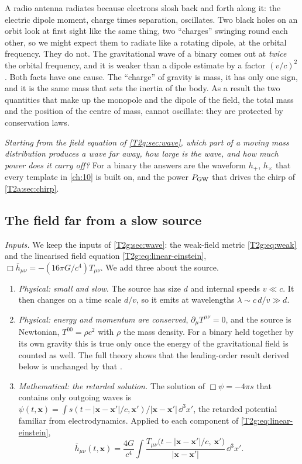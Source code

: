 A radio antenna radiates because electrons slosh back and forth along it: the electric dipole moment, charge times separation, oscillates. Two black holes on an orbit look at first sight like the same thing, two ``charges'' swinging round each other, so we might expect them to radiate like a rotating dipole, at the orbital frequency. They do not. The gravitational wave of a binary comes out at \emph{twice} the orbital frequency, and it is weaker than a dipole estimate by a factor $(v/c)^2$. Both facts have one cause. The ``charge'' of gravity is mass, it has only one sign, and it is the same mass that sets the inertia of the body. As a result the two quantities that make up the monopole and the dipole of the field, the total mass and the position of the centre of mass, cannot oscillate: they are protected by conservation laws.

\emph{Starting from the field equation of \cref{T2g:sec:wave}, which part of a moving mass distribution produces a wave far away, how large is the wave, and how much power does it carry off?} For a binary the answers are the waveform $h_+$, $h_\times$ that every template in \cref{ch:10} is built on, and the power $P_{\rm GW}$ that drives the chirp of \cref{T2a:sec:chirp}.

\subsection{The field far from a slow source}

\emph{Inputs.} We keep the inputs of \cref{T2g:sec:wave}: the weak-field metric \eqref{T2g:eq:weak} and the linearised field equation \eqref{T2g:eq:linear-einstein}, $\Box\bar h_{\mu\nu}=-(16\pi G/c^4)T_{\mu\nu}$. We add three about the source.
\begin{enumerate}[itemsep=1pt]
  \item \emph{Physical: small and slow.} The source has size $d$ and internal speeds $v\ll c$. It then changes on a time scale $d/v$, so it emits at wavelengths $\lambda\sim c\,d/v\gg d$.
  \item \emph{Physical: energy and momentum are conserved}, $\partial_\mu T^{\mu\nu}=0$, and the source is Newtonian, $T^{00}=\rho c^2$ with $\rho$ the mass density. For a binary held together by its own gravity this is true only once the energy of the gravitational field is counted as well. The full theory shows that the leading-order result derived below is unchanged by that \cite[Sec.~3.1]{Maggiore2007}.
  \item \emph{Mathematical: the retarded solution.} The solution of $\Box\psi=-4\pi s$ that contains only outgoing waves is $\psi(t,\bm x)=\int s(t-\lvert\bm x-\bm x'\rvert/c,\bm x')/\lvert\bm x-\bm x'\rvert\,\dd^3x'$, the retarded potential familiar from electrodynamics. Applied to each component of \eqref{T2g:eq:linear-einstein},
  \begin{equation}
    \bar h_{\mu\nu}(t,\bm x)=\frac{4G}{c^4}\int\frac{T_{\mu\nu}\big(t-\lvert\bm x-\bm x'\rvert/c,\ \bm x'\big)}{\lvert\bm x-\bm x'\rvert}\,\dd^3x' .
    \label{T2g:eq:retarded}
  \end{equation}
\end{enumerate}

